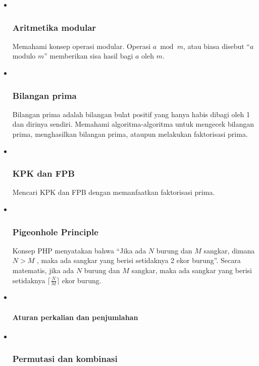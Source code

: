 \documentclass[]{article}
\let\oldparagraph\paragraph
\renewcommand{\paragraph}[1]{\oldparagraph{#1}\mbox{}}
\begin{document}
\begin{itemize}
\item ~
  \subsubsection{Aritmetika modular}\label{aritmetika-modular}

  Memahami konsep operasi modular. Operasi \(a \bmod m\), atau biasa
  disebut ``\(a\) modulo \(m\)'' memberikan sisa hasil bagi \(a\) oleh
  \(m\).
\item ~
  \subsubsection{Bilangan prima}\label{bilangan-prima}

  Bilangan prima adalah bilangan bulat positif yang hanya habis dibagi
  oleh 1 dan dirinya sendiri. Memahami algoritma-algoritma untuk
  mengecek bilangan prima, menghasilkan bilangan prima, ataupun
  melakukan faktorisasi prima.
\item ~
  \subsubsection{KPK dan FPB}\label{kpk-dan-fpb}

  Mencari KPK dan FPB dengan memanfaatkan faktorisasi prima.
\item ~
  \subsubsection{Pigeonhole Principle}\label{pigeonhole-principle}

  Konsep PHP menyatakan bahwa ``Jika ada \(N\) burung dan \(M\) sangkar,
  dimana \(N > M\) , maka ada sangkar yang berisi setidaknya 2 ekor
  burung''. Secara matematis, jika ada \(N\) burung dan \(M\) sangkar,
  maka ada sangkar yang berisi setidaknya
  \(\big\lceil \frac{N}{M} \big\rceil\) ekor burung.
\item ~
  \paragraph{Aturan perkalian dan
  penjumlahan}\label{aturan-perkalian-dan-penjumlahan}
\item ~
  \subsubsection{Permutasi dan kombinasi}\label{permutasi-dan-kombinasi}


\end{itemize}
\end{document}
